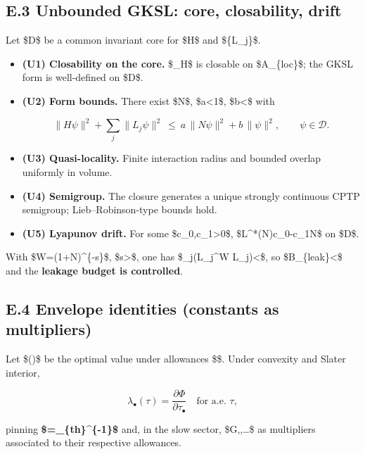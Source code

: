 \documentclass[
]{article}
\numberwithin{equation}{section}
\begin{document}
\hypertarget{e.3-unbounded-gksl-core-closability-drift}{%
\subsection{E.3 Unbounded GKSL: core, closability,
drift}\label{e.3-unbounded-gksl-core-closability-drift}}

Let \$\mathcal D\$ be a common invariant core for \$H\$ and
\$\{L\_j\}\$.

\begin{itemize}
\item
  \textbf{(U1) Closability on the core.} \$\delta\_H\$ is closable on
  \$\mathcal A\_\{\rm loc\}\$; the GKSL form is well-defined on
  \$\mathcal D\$.
\item
  \textbf{(U2) Form bounds.} There exist \$N\$, \$a\textless1\$,
  \$b\textless{}\infty\$ with

  \[
  \|H\psi\|^2+\sum_j\|L_j\psi\|^2\ \le\ a\,\|N\psi\|^2+b\,\|\psi\|^2,\qquad \psi\in\mathcal D.
  \]
\item
  \textbf{(U3) Quasi-locality.} Finite interaction radius and bounded
  overlap uniformly in volume.
\item
  \textbf{(U4) Semigroup.} The closure generates a unique strongly
  continuous CPTP semigroup; Lieb--Robinson-type bounds hold.
\item
  \textbf{(U5) Lyapunov drift.} For some \$c\_0,c\_1\textgreater0\$,
  \$\mathcal L\^{}*(N)\le c\_0-c\_1N\$ on \$\mathcal D\$.
\end{itemize}

With \$W=(1+N)\^{}\{-s\}\$, \$s\textgreater{}\$, one has
\$\sum\_j\omega(L\_j\^{}\dagger W L\_j)\textless{}\infty\$, so
\$\mathcal B\_\{\rm leak\}\textless{}\infty\$ and the \textbf{leakage
budget is controlled}.

\hypertarget{e.4-envelope-identities-constants-as-multipliers}{%
\subsection{E.4 Envelope identities (constants as
multipliers)}\label{e.4-envelope-identities-constants-as-multipliers}}

Let \$\Phi(\tau)\$ be the optimal value under allowances \$\tau\$. Under
convexity and Slater interior,

\[
\lambda_\bullet(\tau)=\frac{\partial\Phi}{\partial\tau_\bullet}\quad\text{for a.e. }\tau,
\]

pinning \textbf{\$\hbar=\lambda\_\{\rm th\}\^{}\{-1\}\$} and, in the
slow sector, \$G,\Lambda,\ldots\$ as multipliers associated to their
respective allowances.
\end{document}
